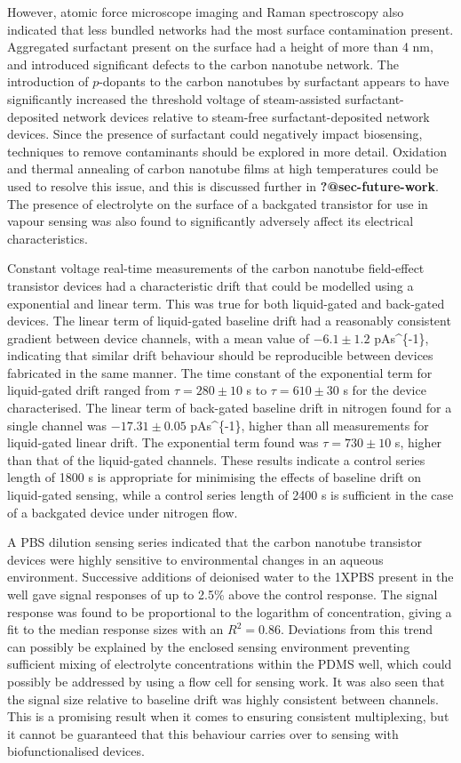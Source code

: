 \documentclass[
  a4paper,
]{scrbook}
\begin{document}
However, atomic force microscope imaging and Raman spectroscopy also
indicated that less bundled networks had the most surface contamination
present. Aggregated surfactant present on the surface had a height of
more than 4 nm, and introduced significant defects to the carbon
nanotube network. The introduction of \(p\)-dopants to the carbon
nanotubes by surfactant appears to have significantly increased the
threshold voltage of steam-assisted surfactant-deposited network devices
relative to steam-free surfactant-deposited network devices. Since the
presence of surfactant could negatively impact biosensing, techniques to
remove contaminants should be explored in more detail. Oxidation and
thermal annealing of carbon nanotube films at high temperatures could be
used to resolve this issue, and this is discussed further in
\textbf{?@sec-future-work}. The presence of electrolyte on the surface
of a backgated transistor for use in vapour sensing was also found to
significantly adversely affect its electrical characteristics.

Constant voltage real-time measurements of the carbon nanotube
field-effect transistor devices had a characteristic drift that could be
modelled using a exponential and linear term. This was true for both
liquid-gated and back-gated devices. The linear term of liquid-gated
baseline drift had a reasonably consistent gradient between device
channels, with a mean value of \(-6.1 \pm 1.2\) pAs\^{}\{-1\},
indicating that similar drift behaviour should be reproducible between
devices fabricated in the same manner. The time constant of the
exponential term for liquid-gated drift ranged from
\(\tau = 280 \pm 10\) s to \(\tau = 610 \pm 30\) s for the device
characterised. The linear term of back-gated baseline drift in nitrogen
found for a single channel was \(-17.31\pm0.05\) pAs\^{}\{-1\}, higher
than all measurements for liquid-gated linear drift. The exponential
term found was \(\tau = 730 \pm 10\) s, higher than that of the
liquid-gated channels. These results indicate a control series length of
1800 s is appropriate for minimising the effects of baseline drift on
liquid-gated sensing, while a control series length of 2400 s is
sufficient in the case of a backgated device under nitrogen flow.

A PBS dilution sensing series indicated that the carbon nanotube
transistor devices were highly sensitive to environmental changes in an
aqueous environment. Successive additions of deionised water to the
1XPBS present in the well gave signal responses of up to 2.5\% above the
control response. The signal response was found to be proportional to
the logarithm of concentration, giving a fit to the median response
sizes with an \(R^2 = 0.86\). Deviations from this trend can possibly be
explained by the enclosed sensing environment preventing sufficient
mixing of electrolyte concentrations within the PDMS well, which could
possibly be addressed by using a flow cell for sensing work. It was also
seen that the signal size relative to baseline drift was highly
consistent between channels. This is a promising result when it comes to
ensuring consistent multiplexing, but it cannot be guaranteed that this
behaviour carries over to sensing with biofunctionalised devices.
\end{document}
